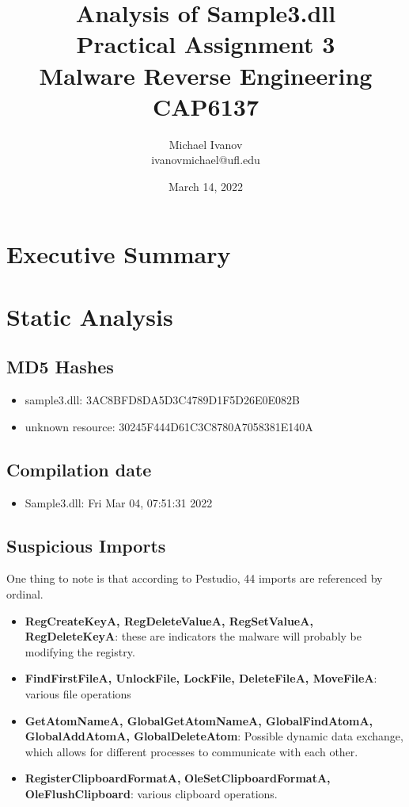 \documentclass{article}
\title{Analysis of Sample3.dll \\Practical Assignment 3\\Malware Reverse Engineering \\
CAP6137}
\author{Michael Ivanov \\
ivanovmichael@ufl.edu}
\date{March 14, 2022}
\begin{document}
    \maketitle
    \pagebreak
    \section{Executive Summary}
    \pagebreak
    \section{Static Analysis}
    \subsection{MD5 Hashes}
    \begin{itemize}
        \item sample3.dll: 3AC8BFD8DA5D3C4789D1F5D26E0E082B
        \item unknown resource: 30245F444D61C3C8780A7058381E140A
    \end{itemize}
    \subsection{Compilation date}
    \begin{itemize}
        \item Sample3.dll: Fri Mar 04, 07:51:31 2022
    \end{itemize}
    \subsection{Suspicious Imports}
    One thing to note is that according to Pestudio, 44 imports are referenced by ordinal.
    \begin{itemize}
        \item \textbf{RegCreateKeyA, RegDeleteValueA, RegSetValueA, RegDeleteKeyA}: these are indicators the malware will probably be modifying the registry.
        \item \textbf{FindFirstFileA, UnlockFile, LockFile, DeleteFileA, MoveFileA}: various file operations
        \item \textbf{GetAtomNameA, GlobalGetAtomNameA, GlobalFindAtomA, GlobalAddAtomA, GlobalDeleteAtom}: Possible dynamic data exchange, which allows for different processes to communicate with each other. \cite{atom}
        \item \textbf{RegisterClipboardFormatA,} \textbf{OleSetClipboardFormatA,} \textbf{OleFlushClipboard}: various clipboard operations.
    \end{itemize}
\end{document}
